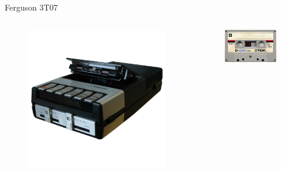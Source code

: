 \documentclass{beamer}
\begin{document}
  \begin{frame}{Ferguson 3T07}
    \begin{columns}
        \begin{figure}
          \includegraphics[scale=0.3]{images/3t07}
        \end{figure}
        \pause
        \begin{figure}
          \includegraphics[scale=0.35]{images/tdkc60}
        \end{figure}
    \end{columns}
  \end{frame}
\end{document}
